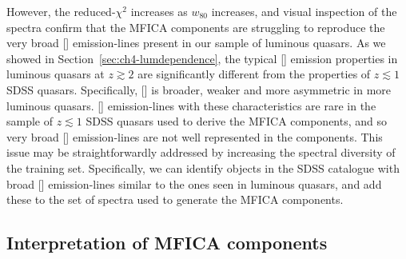 However, the reduced-$\chi^2$ increases as $w_{80}$ increases, and visual inspection of the spectra confirm that the MFICA components are struggling to reproduce the very broad [] emission-lines present in our sample of luminous quasars. 
As we showed in Section~\ref{sec:ch4-lumdependence}, the typical [] emission properties in luminous quasars at $z \gtrsim 2$ are significantly different from the properties of $z \lesssim 1$ SDSS quasars. 
Specifically, [] is broader, weaker and more asymmetric in more luminous quasars.  
[] emission-lines with these characteristics are rare in the sample of $z \lesssim 1$ SDSS quasars used to derive the MFICA components, and so very broad [] emission-lines are not well represented in the components. 
This issue may be straightforwardly addressed by increasing the spectral diversity of the training set. 
Specifically, we can identify objects in the SDSS catalogue with broad [] emission-lines similar to the ones seen in luminous quasars, and add these to the set of spectra used to generate the MFICA components. 

\subsection{Interpretation of MFICA components}

